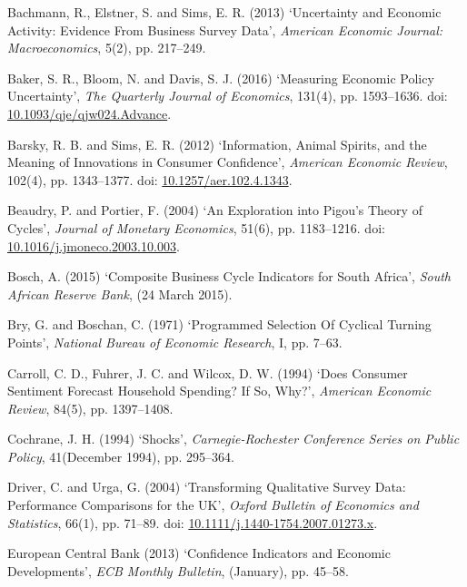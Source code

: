 \documentclass[11pt,]{article}
\begin{document}
\hypertarget{ref-Bachmann2013}{}
Bachmann, R., Elstner, S. and Sims, E. R. (2013) `Uncertainty and
Economic Activity: Evidence From Business Survey Data', \emph{American
Economic Journal: Macroeconomics}, 5(2), pp. 217--249.

\hypertarget{ref-Baker2016}{}
Baker, S. R., Bloom, N. and Davis, S. J. (2016) `Measuring Economic
Policy Uncertainty', \emph{The Quarterly Journal of Economics}, 131(4),
pp. 1593--1636. doi:
\href{https://doi.org/10.1093/qje/qjw024.Advance}{10.1093/qje/qjw024.Advance}.

\hypertarget{ref-Barsky2012}{}
Barsky, R. B. and Sims, E. R. (2012) `Information, Animal Spirits, and
the Meaning of Innovations in Consumer Confidence', \emph{American
Economic Review}, 102(4), pp. 1343--1377. doi:
\href{https://doi.org/10.1257/aer.102.4.1343}{10.1257/aer.102.4.1343}.

\hypertarget{ref-Beaudry2004}{}
Beaudry, P. and Portier, F. (2004) `An Exploration into Pigou's Theory
of Cycles', \emph{Journal of Monetary Economics}, 51(6), pp. 1183--1216.
doi:
\href{https://doi.org/10.1016/j.jmoneco.2003.10.003}{10.1016/j.jmoneco.2003.10.003}.

\hypertarget{ref-Bosch2015}{}
Bosch, A. (2015) `Composite Business Cycle Indicators for South Africa',
\emph{South African Reserve Bank}, (24 March 2015).

\hypertarget{ref-Bry1971}{}
Bry, G. and Boschan, C. (1971) `Programmed Selection Of Cyclical Turning
Points', \emph{National Bureau of Economic Research}, I, pp. 7--63.

\hypertarget{ref-Carroll1994}{}
Carroll, C. D., Fuhrer, J. C. and Wilcox, D. W. (1994) `Does Consumer
Sentiment Forecast Household Spending? If So, Why?', \emph{American
Economic Review}, 84(5), pp. 1397--1408.

\hypertarget{ref-Cochrane1994}{}
Cochrane, J. H. (1994) `Shocks', \emph{Carnegie-Rochester Conference
Series on Public Policy}, 41(December 1994), pp. 295--364.

\hypertarget{ref-Driver2004}{}
Driver, C. and Urga, G. (2004) `Transforming Qualitative Survey Data:
Performance Comparisons for the UK', \emph{Oxford Bulletin of Economics
and Statistics}, 66(1), pp. 71--89. doi:
\href{https://doi.org/10.1111/j.1440-1754.2007.01273.x}{10.1111/j.1440-1754.2007.01273.x}.

\hypertarget{ref-ECB2013}{}
European Central Bank (2013) `Confidence Indicators and Economic
Developments', \emph{ECB Monthly Bulletin}, (January), pp. 45--58.
\end{document}
